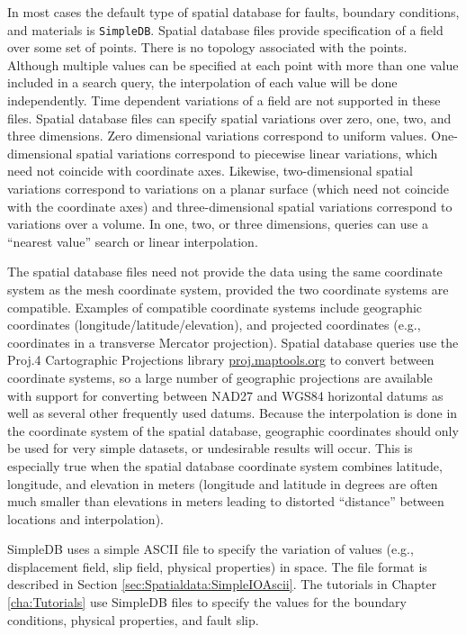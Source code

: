 In most cases the default type of spatial database for faults, boundary
conditions, and materials is \texttt{SimpleDB}. Spatial database files
provide specification of a field over some set of points. There is
no topology associated with the points. Although multiple values can
be specified at each point with more than one value included in a
search query, the interpolation of each value will be done independently.
Time dependent variations of a field are not supported in these files.
Spatial database files can specify spatial variations over zero, one,
two, and three dimensions. Zero dimensional variations correspond
to uniform values. One-dimensional spatial variations correspond to
piecewise linear variations, which need not coincide with coordinate
axes. Likewise, two-dimensional spatial variations correspond to variations
on a planar surface (which need not coincide with the coordinate axes)
and three-dimensional spatial variations correspond to variations
over a volume. In one, two, or three dimensions, queries can use a
``nearest value'' search or linear interpolation.

The spatial database files need not provide the data using the same
coordinate system as the mesh coordinate system, provided the two
coordinate systems are compatible. Examples of compatible coordinate
systems include geographic coordinates (longitude/latitude/elevation),
and projected coordinates (e.g., coordinates in a transverse Mercator
projection). Spatial database queries use the Proj.4 Cartographic
Projections library \url{proj.maptools.org} to convert between coordinate
systems, so a large number of geographic projections are available
with support for converting between NAD27 and WGS84 horizontal datums
as well as several other frequently used datums. Because the interpolation
is done in the coordinate system of the spatial database, geographic
coordinates should only be used for very simple datasets, or undesirable
results will occur. This is especially true when the spatial database
coordinate system combines latitude, longitude, and elevation in meters
(longitude and latitude in degrees are often much smaller than elevations
in meters leading to distorted ``distance'' between locations and
interpolation).

SimpleDB uses a simple ASCII file to specify the variation of values
(e.g., displacement field, slip field, physical properties) in space.
The file format is described in Section \ref{sec:Spatialdata:SimpleIOAscii}.
The tutorials in Chapter \ref{cha:Tutorials} use SimpleDB files to
specify the values for the boundary conditions,  physical properties,
and fault slip.

